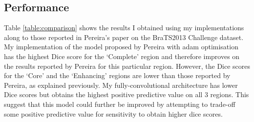\documentclass[12pt,a4paper,twoside,openright]{report}
\begin{document}
\subsection{Performance}
Table \ref{table:comparison} shows the results I obtained using my implementations along to those reported in Pereira's paper on the BraTS2013 Challenge dataset. My implementation of the model proposed by Pereira with adam optimisation has the highest Dice score for the `Complete' region and therefore improves on the results reported by Pereira for this particular region. However, the Dice scores for the `Core' and the `Enhancing' regions are lower than those reported by Pereira, as explained previously. My fully-convolutional architecture has lower Dice scores but obtains the highest positive predictive value on all 3 regions. This suggest that this model could further be improved by attempting to trade-off some positive predictive value for sensitivity to obtain higher dice scores. 

\begin{table}[h]
\centering	
{}
\caption{Comparison of model performances on the Brats2013 Challenge dataset.}
\label{table:comparison}
\end{table}
\end{document}
